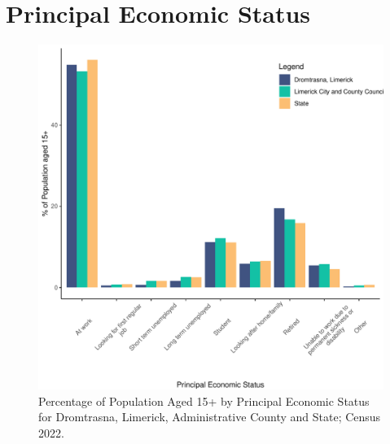 \documentclass{article}
\begin{document}
  
\pagebreak
\section{Principal Economic Status}\label{sect:PES}
\begin{figure}[H]
	\centering
	\includegraphics[width = 140mm]{../figures/PESED.pdf}
	\caption{Percentage of Population Aged 15+ by Principal Economic Status for Dromtrasna, Limerick, Administrative County and State; Census 2022.}
	\label{fig:vbnv}
	\end{figure}
\end{document}
